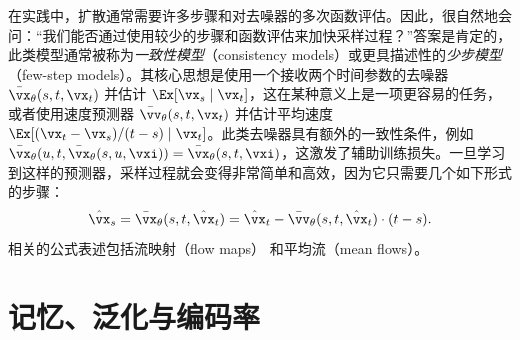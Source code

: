 \documentclass[../../book-main_zh.tex]{subfiles}
\begin{document}
\begin{remark}
    在实践中，扩散通常需要许多步骤和对去噪器的多次函数评估。因此，很自然地会问：“我们能否通过使用较少的步骤和函数评估来加快采样过程？”答案是肯定的，此类模型通常被称为\textit{一致性模型}（consistency models）或更具描述性的\textit{少步模型}（few-step models）。其核心思想是使用一个接收两个时间参数的去噪器 \(\bar{\vx}_{\theta}(s, t,
    \vx_{t})\) 并估计 \(\Ex[\vx_{s} \mid \vx_{t}]\)，这在某种意义上是一项更容易的任务，或者使用速度预测器 \(\bar{\vv}_{\theta}(s, t, \vx_{t})\) 并估计平均速度 \(\Ex[(\vx_{t} - \vx_{s})/(t - s) \mid \vx_{t}]\)。此类去噪器具有额外的一致性条件，例如 \(\bar{\vx}_{\theta}(u, t,
    \bar{\vx}_{\theta}(s, u, \vxi)) = \bar{\vx}_{\theta}(s, t, \vxi)\)，这激发了辅助训练损失。一旦学习到这样的预测器，采样过程就会变得非常简单和高效，因为它只需要几个如下形式的步骤：
    \begin{equation}
        \hat{\vx}_{s} = \bar{\vx}_{\theta}(s, t, \hat{\vx}_{t}) =
        \hat{\vx}_{t} - \bar{\vv}_{\theta}(s, t, \hat{\vx}_{t})\cdot(t - s).
    \end{equation}
    相关的公式表述包括流映射（flow maps）\cite{boffi2025build} 和平均流（mean flows）\cite{geng2025mean}。
\end{remark}

\section{记忆、泛化与编码率}
\label{sec:diffusion_memorization}
\end{document}
